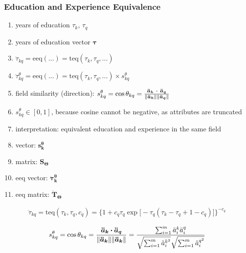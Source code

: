 \documentclass{elsarticle} %
\begin{document}
\subsubsection{Education and Experience Equivalence}
\begin{enumerate}
    \item years of education $\tau_k$, $\tau_q$
    \item years of education vector $\boldsymbol{\tau}$
    \item $\ddot{\tau}_{kq} = \text{eeq}(...) = \text{teq}(\tau_k, \tau_q, ...)$
    \item $\ddot{\tau}_{kq}^{\theta} = \text{eeq}(...) = \text{teq}(\tau_k, \tau_q, ...) \times s_{kq}^{\theta}$
    \item field similarity (direction): $s_{kq}^{\theta} = \cos\theta_{kq} = \frac{
                  \boldsymbol{\ddot{a}_{k} \ \dotproduct\ \boldsymbol{\ddot{a}_{q}}} }{
                  \norm{\boldsymbol{\ddot{a}_{k}}} \norm{\boldsymbol{\ddot{a}_{q}}} } $
    \item $s_{kq}^{\theta} \in [0,1]$, because cosine cannot be negative, as attributes are truncated
    \item interpretation: equivalent education and experience in the same field
    \item vector: $\boldsymbol{s_{k}^{\theta}}$
    \item matrix: $\textbf{S}_{\mathbf{\Theta}}$
    \item eeq vector: $\boldsymbol{\ddot{\tau}_{k}^{\theta}}$
    \item eeq matrix: $\boldsymbol{\ddot{\textbf{T}}_{\mathbf{\Theta}}}$
\end{enumerate}
\begin{gather}
    \ddot{\tau}_{kq} =
    \text{teq}(\tau_k,\tau_q,c_q) =
    \big\{
    1 + c_q \tau_q
    \exp\big[
        -\tau_q (
        \tau_k - \tau_q + 1 - c_q
        )
        \big]
    \big\} ^ {-c_q}
\end{gather}

\begin{gather}
    s_{kq}^{\theta} =
    \cos\theta_{kq} =
    \frac{
        \boldsymbol{\ddot{a}_k}
        \dotproduct
        \boldsymbol{\ddot{a}_q}
    }{
        \norm{\boldsymbol{\ddot{a}_k}}
        \norm{\boldsymbol{\ddot{a}_k}}
    } =
    \frac{
    \sum_{i=1}^{m}{
    \ddot{a}_{i}^{k}
    \ddot{a}_{i}^{q}
    }
    }{
    \sqrt{
    \sum_{i=1}^{m}{
    \ddot{a}_{i}^{{k} ^ 2}
    }
    }
    \sqrt{
    \sum_{i=1}^{m}{
    \ddot{a}_{i}^{{q} ^ 2}
    }
    }
    }
\end{gather}
\end{document}
